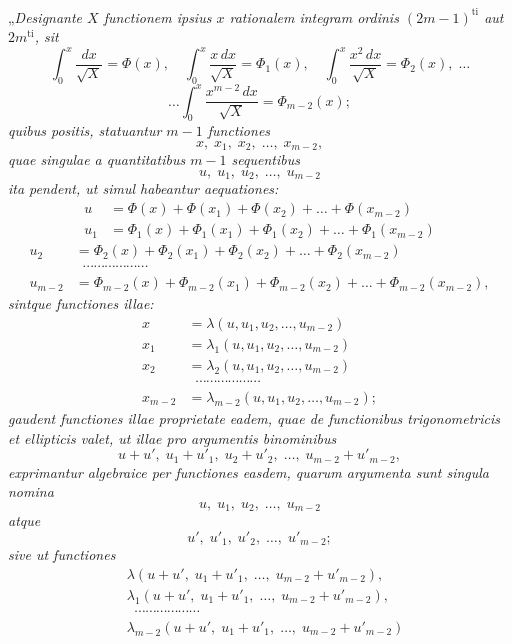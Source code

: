 \documentclass{article}
\begin{document}
„\emph{Designante $X$ functionem ipsius $x$ rationalem integram ordinis $(2m-1)^{\text{ti}}$ aut $2m^{\text{ti}}$, sit}
\[ \int_0^{x} \frac{dx}{\sqrt{X}} = \Phi(x), \quad \int_0^{x} \frac{x\,dx}{\sqrt{X}} = \Phi_1(x), \quad \int_0^{x} \frac{x^{2}\,dx}{\sqrt{X}} = \Phi_2(x), \; \ldots \]
\[ \ldots \int_0^{x} \frac{x^{m-2}\,dx}{\sqrt{X}} = \Phi_{m-2}(x); \]
\emph{quibus positis, statuantur $m-1$ functiones}
\[ x, \; x_1, \; x_2, \; \ldots, \; x_{m-2}, \]
\emph{quae singulae a quantitatibus $m-1$ sequentibus}
\[ u, \; u_1, \; u_2, \; \ldots, \; u_{m-2} \]
\emph{ita pendent, ut simul habeantur aequationes:}
\[ \begin{aligned} u &= \Phi(x) + \Phi(x_1) + \Phi(x_2) + \ldots + \Phi(x_{m-2}) \\ u_1 &= \Phi_1(x) + \Phi_1(x_1) + \Phi_1(x_2) + \ldots + \Phi_1(x_{m-2}) \end{aligned} \]
\[ \begin{aligned} u_2 &= \Phi_2(x) + \Phi_2(x_1) + \Phi_2(x_2) + \ldots + \Phi_2(x_{m-2}) \\ &\;\; \cdots\cdots\cdots\cdots\cdots\cdots \\ u_{m-2} &= \Phi_{m-2}(x) + \Phi_{m-2}(x_1) + \Phi_{m-2}(x_2) + \ldots + \Phi_{m-2}(x_{m-2}), \end{aligned} \]
\emph{sintque functiones illae:}
\[ \begin{aligned} x &= \lambda(u, u_1, u_2, \ldots, u_{m-2}) \\ x_1 &= \lambda_1(u, u_1, u_2, \ldots, u_{m-2}) \\ x_2 &= \lambda_2(u, u_1, u_2, \ldots, u_{m-2}) \\ &\;\; \cdots\cdots\cdots\cdots\cdots\cdots \\ x_{m-2} &= \lambda_{m-2}(u, u_1, u_2, \ldots, u_{m-2}); \end{aligned} \]
\emph{gaudent functiones illae proprietate eadem, quae de functionibus trigonometricis et ellipticis valet, ut illae pro argumentis binominibus}
\[ u + u', \; u_1 + u'_1, \; u_2 + u'_2, \; \ldots, \; u_{m-2} + u'_{m-2}, \]
\emph{exprimantur algebraice per functiones easdem, quarum argumenta sunt singula nomina}
\[ u, \; u_1, \; u_2, \; \ldots, \; u_{m-2} \]
\emph{atque}
\[ u', \; u'_1, \; u'_2, \; \ldots, \; u'_{m-2}; \]
\emph{sive ut functiones}
\[ \begin{aligned} &\lambda(u + u', \; u_1 + u'_1, \; \ldots, \; u_{m-2} + u'_{m-2}), \\ &\lambda_1(u + u', \; u_1 + u'_1, \; \ldots, \; u_{m-2} + u'_{m-2}), \\ &\;\; \cdots\cdots\cdots\cdots\cdots\cdots \\ &\lambda_{m-2}(u + u', \; u_1 + u'_1, \; \ldots, \; u_{m-2} + u'_{m-2}) \end{aligned} \]
\end{document}
